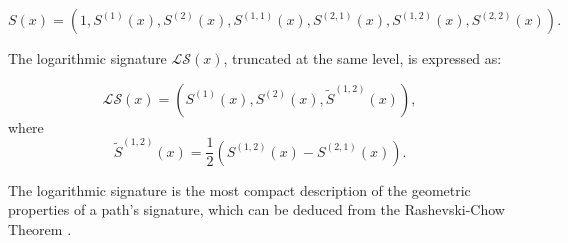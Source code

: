 \begin{equation}
S(x) = (1, S^{(1)}(x), S^{(2)}(x), S^{(1,1)}(x), S^{(2,1)}(x), S^{(1,2)}(x), S^{(2,2)}(x)).
\end{equation}

The logarithmic signature \( \mathcal{LS}(x) \), truncated at the same level, is expressed as:

\begin{equation}
\mathcal{LS}(x) = \left(S^{(1)}(x), S^{(2)}(x), \tilde{S}^{(1,2)}(x)\right),
\label{eq:logsig-truncated}
\end{equation}
where
\begin{equation}
\tilde{S}^{(1,2)}(x) = \frac{1}{2}\left(S^{(1,2)}(x) - S^{(2,1)}(x)\right).
\end{equation}

The logarithmic signature is the most compact description of the geometric properties of a path's signature, which can be deduced from the Rashevski-Chow Theorem \cite{lyonsRadiusConvergenceLogarithmic2006}.


